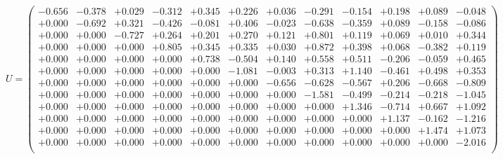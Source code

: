 \documentclass[9pt]{article}
\theoremstyle{plain}
\theoremstyle{definition}
\theoremstyle{remark}
\numberwithin{equation}{section}
\begin{document}
$U = \left(
\begin{array}{
cccccccccccc}
-0.656 & -0.378 & +0.029 & -0.312 & +0.345 & +0.226 & +0.036 & -0.291 & -0.154 & +0.198 & +0.089 & -0.048 \\
+0.000 & -0.692 & +0.321 & -0.426 & -0.081 & +0.406 & -0.023 & -0.638 & -0.359 & +0.089 & -0.158 & -0.086 \\
+0.000 & +0.000 & -0.727 & +0.264 & +0.201 & +0.270 & +0.121 & +0.801 & +0.119 & +0.069 & +0.010 & +0.344 \\
+0.000 & +0.000 & +0.000 & +0.805 & +0.345 & +0.335 & +0.030 & +0.872 & +0.398 & +0.068 & -0.382 & +0.119 \\
+0.000 & +0.000 & +0.000 & +0.000 & +0.738 & -0.504 & +0.140 & +0.558 & +0.511 & -0.206 & -0.059 & +0.465 \\
+0.000 & +0.000 & +0.000 & +0.000 & +0.000 & -1.081 & -0.003 & +0.313 & +1.140 & -0.461 & +0.498 & +0.353 \\
+0.000 & +0.000 & +0.000 & +0.000 & +0.000 & +0.000 & -0.656 & -0.628 & -0.567 & +0.206 & -0.668 & -0.809 \\
+0.000 & +0.000 & +0.000 & +0.000 & +0.000 & +0.000 & +0.000 & -1.581 & -0.499 & -0.214 & -0.218 & -1.045 \\
+0.000 & +0.000 & +0.000 & +0.000 & +0.000 & +0.000 & +0.000 & +0.000 & +1.346 & -0.714 & +0.667 & +1.092 \\
+0.000 & +0.000 & +0.000 & +0.000 & +0.000 & +0.000 & +0.000 & +0.000 & +0.000 & +1.137 & -0.162 & -1.216 \\
+0.000 & +0.000 & +0.000 & +0.000 & +0.000 & +0.000 & +0.000 & +0.000 & +0.000 & +0.000 & +1.474 & +1.073 \\
+0.000 & +0.000 & +0.000 & +0.000 & +0.000 & +0.000 & +0.000 & +0.000 & +0.000 & +0.000 & +0.000 & -2.016 \\
\end{array}
\right)$ \newline 
\end{document}
